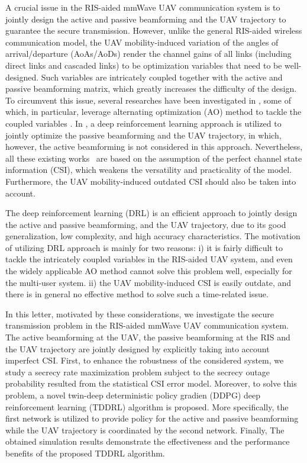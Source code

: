 \documentclass[12pt, draftclsnofoot, onecolumn]{IEEEtran}
\begin{document}
A crucial issue in the RIS-aided mmWave UAV communication system is to jointly design the active and passive beamforming and the UAV trajectory to guarantee the secure transmission. However, unlike the general RIS-aided wireless communication model, the UAV mobility-induced variation of the angles of arrival/departure (AoAs/AoDs) render the channel gains of all links (including direct links and cascaded links) to be optimization variables that need to be well-designed. Such variables are intricately coupled together with the active and passive beamforming matrix, which greatly increases the difficulty of the design. To circumvent this issue, several researches have been investigated in \cite{RIS-3,RISUAV-1,RISUAV-5,RISUAV-6,RISUAV-9}, some of which, in particular, leverage alternating optimization (AO) method to tackle the coupled variables \cite{RIS-3,RISUAV-1,RISUAV-5,RISUAV-9}. In \cite{RISUAV-6}, a deep reinforcement learning approach is utilized to jointly optimize the passive beamforming and the UAV trajectory, in which, however, the active beamforming is not considered in this approach. Nevertheless, all these existing works~\cite{RIS-3,RISUAV-1,RISUAV-5,RISUAV-6} are based on the assumption of the perfect channel state information (CSI), which weakens the versatility and practicality of the model. Furthermore, the UAV mobility-induced outdated CSI should also be taken into account. 

The deep reinforcement learning (DRL) is an efficient approach to jointly design the active and passive beamforming, and the UAV trajectory, due to its good generalization, low complexity, and high accuracy characteristics. The motivation of utilizing DRL approach is mainly for two reasons: i) it is fairly difficult to tackle the intricately coupled variables in the RIS-aided UAV system, and even the widely applicable AO method cannot solve this problem well, especially for the multi-user system. ii) the UAV mobility-induced CSI is easily outdate, and there is in general no effective method to solve such a time-related issue.


In this letter, motivated by these considerations, we investigate the secure transmission problem in the RIS-aided mmWave UAV communication system. The active beamforming at the UAV, the passive beamforming at the RIS and the UAV trajectory are jointly designed by explicitly taking into account imperfect CSI. First, to enhance the robustness of the considered system, we study a secrecy rate maximization problem subject to the secrecy outage probability resulted from the statistical CSI error model. Moreover, to solve this problem, a novel twin-deep deterministic policy gradien (DDPG) deep reinforcement learning (TDDRL) algorithm is proposed. More specifically, the first network is utilized to provide policy for the active and passive beamforming while the UAV trajectory is coordinated by the second network. Finally, The obtained simulation results demonstrate the effectiveness and the performance benefits of the proposed TDDRL algorithm.
\end{document}
